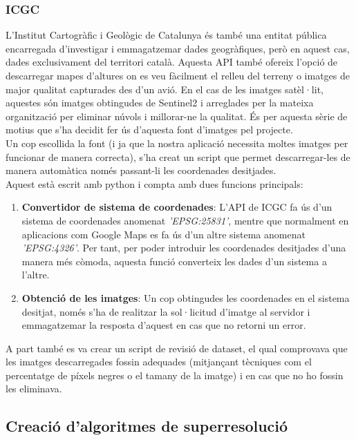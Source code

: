 ﻿\documentclass[10pt,a4paper,twocolumn,twoside]{article}
\begin{document}
\subsubsection{ICGC}
L'Institut Cartogràfic i Geològic de Catalunya \cite{icgc} és també una entitat pública encarregada d'investigar i emmagatzemar dades geogràfiques, però en aquest cas, dades exclusivament del territori català. Aquesta API també ofereix l'opció de descarregar mapes d'altures on es veu fàcilment el relleu del terreny o imatges de major qualitat capturades des d'un avió.
En el cas de les imatges satèl·lit, aquestes són imatges obtingudes de Sentinel2 i arreglades per la mateixa organització per eliminar núvols i millorar-ne la qualitat. És per aquesta sèrie de motius que s'ha decidit fer ús d'aquesta font d'imatges pel projecte.\\

Un cop escollida la font (i ja que la nostra aplicació necessita moltes imatges per funcionar de manera correcta), s'ha creat un script que permet descarregar-les de manera automàtica només passant-li les coordenades desitjades.\\

Aquest està escrit amb python i compta amb dues funcions principals:
\begin{enumerate}
\item{\textbf{Convertidor de sistema de coordenades}}: L'API de ICGC fa ús d'un sistema de coordenades anomenat \textit{'EPSG:25831'}, mentre que normalment en aplicacions com Google Maps es fa ús d'un altre sistema anomenat \textit{'EPSG:4326'}. Per tant, per poder introduir les coordenades desitjades d'una manera més còmoda, aquesta funció converteix les dades d'un sistema a l'altre.
\item{\textbf{Obtenció de les imatges}}: Un cop obtingudes les coordenades en el sistema desitjat, només s'ha de realitzar la sol·licitud d'imatge al servidor i emmagatzemar la resposta d'aquest en cas que no retorni un error.
\end{enumerate}
A part també es va crear un script de revisió de dataset, el qual comprovava que les imatges descarregades fossin adequades (mitjançant tècniques com el percentatge de píxels negres o el tamany de la imatge) i en cas que no ho fossin les eliminava.

\subsection{Creació d'algoritmes de superresolució}
\end{document}
